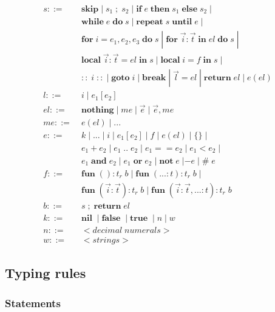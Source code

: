 \documentclass[12pt]{article}
\newcommand{\pipe}{|\;}
\newcommand{\kw}[1]{\mathbf{#1} \;}
\begin{document}
\begin{align*}
s ::= \; & \kw{skip} \pipe s_{1} \;;\; s_{2} \; \pipe
\kw{if} e \; \kw{then} s_{1} \; \kw{else} s_{2} \; \pipe\\
& \kw{while} e \; \kw{do} s \; \pipe
\kw{repeat} s \; \kw{until} e \; \pipe\\
& \kw{for} i=e_{1},e_{2},e_{3} \; \kw{do} s \; \pipe
\kw{for} \vec{i}:\vec{t} \; \kw{in} el \; \kw{do} s \; \pipe\\
& \kw{local} \vec{i}:\vec{t} = el \; \kw{in} s \; \pipe
\kw{local} i = f \; \kw{in} s \; \pipe\\
& \kw{::} i \; \kw{::} \pipe \kw{goto} i \; \pipe \kw{break} \pipe
\vec{l} = el \; \pipe \kw{return} el \; \pipe e(el)\\
l ::= \; & i \; \pipe e_{1}[e_{2}]\\
el ::= \; & \kw{nothing} \pipe me \; \pipe \vec{e} \; \pipe \vec{e},me\\
me ::= \; & e(el) \; \pipe {...}\\
e ::= \; & k \; \pipe {...} \; \pipe i \; \pipe e_{1}[e_{2}] \; \pipe
f \; \pipe e(el) \; \pipe \{\} \; \pipe\\
& e_{1} + e_{2} \; \pipe e_{1} \; {..} \; e_{2} \; \pipe
e_{1} == e_{2} \; \pipe e_{1} < e_{2} \; \pipe\\
& e_{1} \; \kw{and} e_{2} \; \pipe e_{1} \; \kw{or} e_{2} \; \pipe
\kw{not} e \; | - e \; \pipe \# \; e\\
f ::= \; & \kw{fun} ():t_{r} \; b \; \pipe
\kw{fun} ({...}:t):t_{r} \; b \; \pipe\\
& \kw{fun} (\vec{i}:\vec{t}):t_{r} \; b \; \pipe
\kw{fun} (\vec{i}:\vec{t},{...}:t):t_{r} \; b\\
b ::= \; & s \;;\; \kw{return} el\\
k ::= \; & \kw{nil} \; \pipe \kw{false} \; \pipe \kw{true} \; \pipe
n \; \pipe w\\
n ::= \; & {<}decimal\;numerals{>}\\
w ::= \; & {<}strings{>}
\end{align*}

\subsection{Typing rules}

\subsubsection{Statements}
\end{document}
